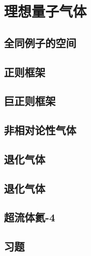 \chapter{理想量子气体}

\section{全同例子的空间}
\section{正则框架}
\section{巨正则框架}
\section{非相对论性气体}
\section{退化{\fermi}气体}
\section{退化{\bose}气体}
\section{超流体氦-4}
\section*{习题}